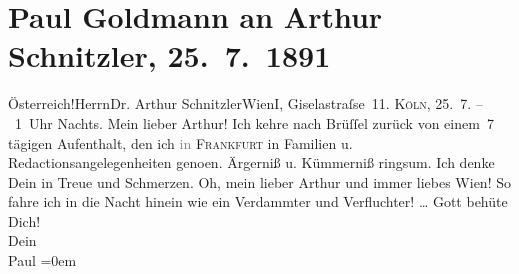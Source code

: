 

         
         \renewcommand{\erwaehntePersonen}{Personen: Paul Goldmann}
         \renewcommand{\erwaehnteOrte}{Orte: Brüssel, Frankfurt am Main, I., Innere Stadt, Köln, Ordination Dr. Arthur Schnitzler Giselastraße 11, Wien, Österreich}
         \renewcommand{\erwaehnteWerke}{}
               \section[Paul Goldmann an Arthur Schnitzler, 25. 7. 1891]{ Paul Goldmann an Arthur Schnitzler, 25. 7. 1891}\nopagebreak{}\rehead{ }\begin{ledgroupsized}[t]{13cm}\normalsize\beginnumbering{} \toendnotes[C]{\smallbreak\pagebreak[2]} 
\toendnotes[C]{\smallbreak}\pstart{}{\pb}Österreich!\pend{}\pstart{}Herrn\pend{}\pstart{}Dr. Arthur Schnitzler\pend{}\pstart{}Wien\pend{}\pstart{}I, Giselastraſse 11.\pend{}{\bigskip}\pstart
           \noindent{}{\pb}\textsc{Köln}, 25. 7. – 1 Uhr Nachts. Mein lieber Arthur! Ich kehre nach Brüſſel zurück von einem 7 tägigen Aufenthalt, den ich
                  \textcolor{gray}{in}{ }\textsc{Frankfurt} in Familien u. Redactionsangelegenheiten geno{\geminationm}en.
               Ärgerniß u. Kümmerniß ringsum. Ich denke Dein in Treue und Schmerzen. Oh, mein lieber
               Arthur und immer liebes Wien! So fahre ich in die
               Nacht hinein wie ein Verdammter und Verfluchter! {\dots}\pend
           \pstart
           Gott behüte Dich!{\\[\baselineskip]}Dein {\\[\baselineskip]}\spacefill\mbox{Paul}\pend
           \leftskip=0em{}\pstart
           \noindent{}\label{T_L02667-1v}\label{T_L02667-1h}\pend
           

\end{ledgroupsized}
